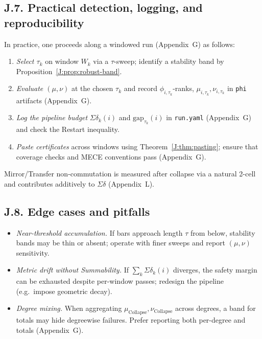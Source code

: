 \documentclass[11pt]{article}
\numberwithin{equation}{section}
\theoremstyle{definition}
\DeclareRobustCommand{\muc}{\mu_{\mathrm{Collapse}}}
\DeclareRobustCommand{\nuc}{\nu_{\mathrm{Collapse}}}
\begin{document}
\subsection*{J.7. Practical detection, logging, and reproducibility}
In practice, one proceeds along a windowed run (Appendix~G) as follows:
\begin{enumerate}\itemsep0.25em
  \item \emph{Select \(\tau_k\)} on window \(W_k\) via a \(\tau\)-sweep; identify a stability band by Proposition~\ref{J:prop:robust-band}.
  \item \emph{Evaluate \((\mu,\nu)\)} at the chosen \(\tau_k\) and record \(\phi_{i,\tau_k}\)-ranks, \(\mu_{i,\tau_k},\nu_{i,\tau_k}\) in \texttt{phi} artifacts (Appendix~G).
  \item \emph{Log the pipeline budget} \(\Sigma\delta_k(i)\) and \(\mathrm{gap}_{\tau_k}(i)\) in \texttt{run.yaml} (Appendix~G) and check the Restart inequality.
  \item \emph{Paste certificates} across windows using Theorem~\ref{J:thm:pasting}; ensure that coverage checks and MECE conventions pass (Appendix~G).
\end{enumerate}
Mirror/Transfer non-commutation is measured after collapse via a natural 2-cell and contributes additively to \(\Sigma\delta\) (Appendix~L).

\subsection*{J.8. Edge cases and pitfalls}
\begin{itemize}\itemsep0.25em
  \item \emph{Near-threshold accumulation.} If bars approach length \(\tau\) from below, stability bands may be thin or absent; operate with finer sweeps and report \((\mu,\nu)\) sensitivity.
  \item \emph{Metric drift without Summability.} If \(\sum_k\Sigma\delta_k(i)\) diverges, the safety margin can be exhausted despite per-window passes; redesign the pipeline (e.g.\ impose geometric decay).
  \item \emph{Degree mixing.} When aggregating \(\muc,\nuc\) across degrees, a band for totals may hide degreewise failures. Prefer reporting both per-degree and totals (Appendix~G).
\end{itemize}

\end{document}
